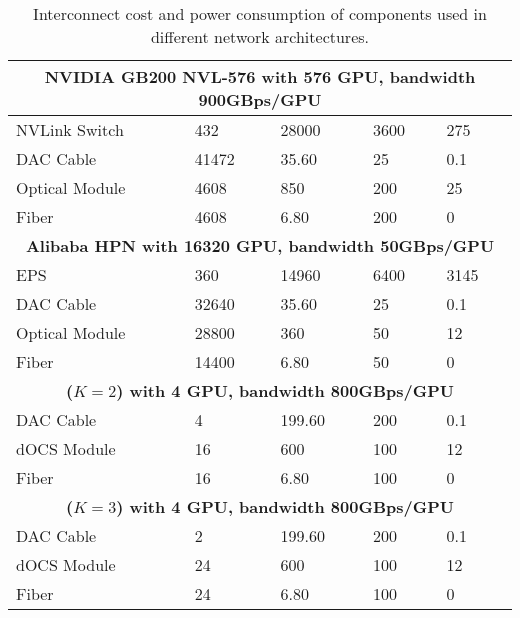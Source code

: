 \begin{appendices}
\begin{table*}[h!t]
\begin{tabular}{lllll}
    \midrule
    \multicolumn{5}{c}{\textbf{NVIDIA GB200 NVL-576\cite{SEMIANALYSIS_GB200} with 576 GPU, bandwidth 900GBps/GPU}}\\
    \midrule
    NVLink Switch\cite{SEMIANALYSIS_Power} & 432 & 28000 & 3600 & 275 \\
    DAC Cable\cite{200G_DAC} & 41472 & 35.60 & 25 & 0.1 \\
    Optical Module\cite{OSFPXD} & 4608 & 850 & 200 & 25 \\
    Fiber\cite{FIBER} & 4608 & 6.80 & 200 & 0 \\

    \midrule
    \multicolumn{5}{c}{\textbf{Alibaba HPN\cite{sigcomm2024hpn} with 16320 GPU, bandwidth 50GBps/GPU}}\\
    \midrule
    EPS\cite{51.2T_EPS} & 360 & 14960 & 6400 & 3145 \\
    DAC Cable\cite{200G_DAC} & 32640 & 35.60 & 25 & 0.1\\
    Optical Module\cite{400G_OPTICAL_MODULE} & 28800 & 360 & 50 & 12 \\
    Fiber\cite{FIBER} & 14400 & 6.80 & 50 & 0 \\

    \midrule
    \multicolumn{5}{c}{\textbf{\SYS{}($K=2$)  with 4 GPU, bandwidth 800GBps/GPU}}\\
    \midrule
    DAC Cable\cite{1.6T_DAC}& 4 & 199.60 & 200 & 0.1\\
    dOCS Module & 16 & 600 & 100 & 12 \\
    Fiber\cite{FIBER} & 16 & 6.80 & 100 & 0 \\

    \midrule
    \multicolumn{5}{c}{\textbf{\SYS{}($K=3$)  with 4 GPU, bandwidth 800GBps/GPU}}\\
    \midrule
    DAC Cable\cite{1.6T_DAC} & 2 & 199.60 & 200 & 0.1\\
    dOCS Module & 24 & 600 & 100 & 12 \\
    Fiber\cite{FIBER} & 24 & 6.80 & 100 & 0 \\
    \bottomrule
    \end{tabular}
    \caption{Interconnect cost and power consumption of components used in different network architectures.}
    \label{tab:eval:components}
\end{table*}


\end{appendices}



